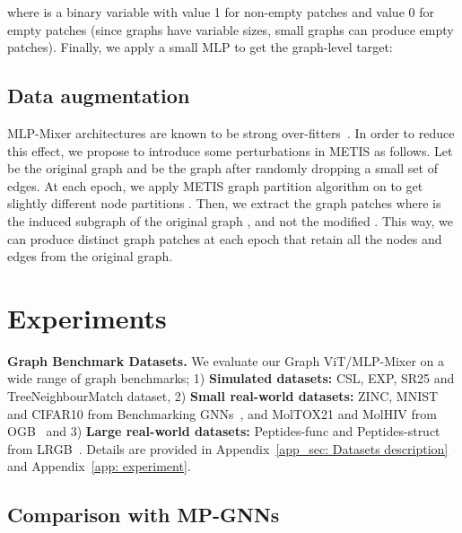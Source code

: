 \documentclass{article}
\begin{document}
where  is a binary variable with value 1 for non-empty patches and value 0 for empty patches (since graphs have variable sizes, small graphs can produce empty patches). 
Finally, we apply a small MLP to get the graph-level target:




\subsection{Data augmentation}\label{subsec: data augmentation}
MLP-Mixer architectures are known to be strong over-fitters~\citep{liu2021gmlp}. 
In order to reduce this effect, we propose to introduce some perturbations in METIS as follows. Let  be the original graph and  be the graph after randomly dropping a small set of edges. At each epoch, we apply METIS graph partition algorithm on  to get slightly different node partitions . Then, we extract the graph patches  where  is the induced subgraph of the original graph , and not the modified . This way, we can produce distinct graph patches at each epoch that retain all the nodes and edges from the original graph.


\section{Experiments}
{\bf Graph Benchmark Datasets.} 
We evaluate our Graph ViT/MLP-Mixer on a wide range of graph benchmarks; 1) \textbf{Simulated datasets:} CSL, EXP, SR25 and TreeNeighbourMatch dataset,
2) \textbf{Small real-world datasets:} ZINC, MNIST and CIFAR10 from Benchmarking GNNs~\citep{dwivedi2020benchmarking}, and MolTOX21 and MolHIV from OGB~\citep{hu2020open} and 3) \textbf{Large real-world datasets:} Peptides-func and Peptides-struct from LRGB~\citep{dwivedi2022long}. Details are provided in Appendix~\ref{app_sec: Datasets description} and Appendix~\ref{app: experiment}.


\subsection{Comparison with MP-GNNs}
\end{document}
